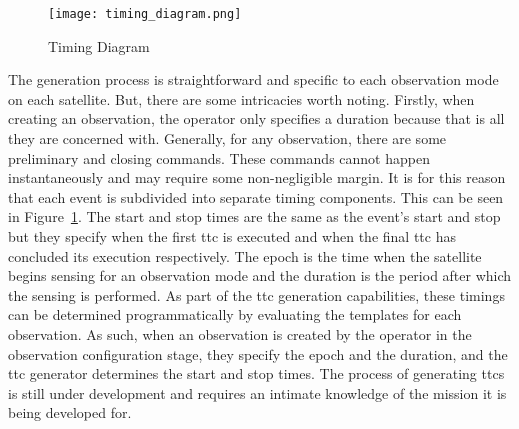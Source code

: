 \begin{figure}[h] 
    \centering
    \texttt{[image: timing\_diagram.png]} 
    \caption{Timing Diagram}
    \label{fig:timing-diagram} 
\end{figure}

The generation process is straightforward and specific to each observation mode
on each satellite. But, there are some intricacies worth noting. Firstly, when
creating an observation, the operator only specifies a duration because that is
all they are concerned with.  Generally, for any observation, there are some
preliminary and closing commands. These commands cannot happen instantaneously
and may require some non-negligible margin. It is for this reason that each
event is subdivided into separate timing components.  This can be seen in
Figure~\ref{fig:timing-diagram}. The start and stop times are the same as the event’s
start and stop but they specify when the first \gls{ttc} is executed and when
the final \gls{ttc} has concluded its execution respectively.  The epoch is the
time when the satellite begins sensing for an observation mode and the duration
is the period after which the sensing is performed. As part of the \gls{ttc}
generation capabilities, these timings can be determined programmatically by
evaluating the templates for each observation. As such, when an observation is
created by the operator in the observation configuration stage, they specify
the epoch and the duration, and the \gls{ttc} generator determines the start
and stop times. The process of generating \glspl{ttc} is still under
development and requires an intimate knowledge of the mission it is being
developed for. 




